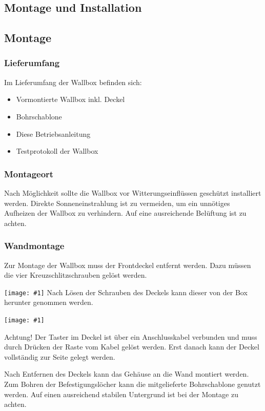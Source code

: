 \documentclass[a4paper,10pt]{article}
\newcommand{\gfx}[1]{\texttt{[image: \#1]}}
\begin{document}
\begin{multicols*}{2}
	\section{Montage und Installation}
	\subsection{Montage}
	\subsubsection{Lieferumfang}
	Im Lieferumfang der Wallbox befinden sich:
	\begin{itemize}
		\item Vormontierte Wallbox inkl. Deckel
		\item Bohrschablone
		\item Diese Betriebsanleitung
		\item Testprotokoll der Wallbox
	\end{itemize}

	\subsubsection{Montageort}
	Nach Möglichkeit sollte die Wallbox vor Witterungseinflüssen geschützt
	installiert werden. Direkte Sonneneinstrahlung ist zu vermeiden, um ein
	unnötiges Aufheizen der Wallbox zu verhindern. Auf eine ausreichende Belüftung
	ist zu achten.

	\subsubsection{Wandmontage}\label{wandmontage}
	Zur Montage der Wallbox muss der Frontdeckel entfernt werden. Dazu müssen die
	vier Kreuzschlitzschrauben gelöst werden.

	\gfx{./img/resized/warp_screw_points_ready}
	Nach Lösen der Schrauben des Deckels kann dieser von der Box herunter genommen
	werden.

	\gfx{./img/resized/warp_button_connect_arrow_ready}

	Achtung! Der Taster im Deckel ist über ein Anschlusskabel verbunden und muss
	durch Drücken der Raste vom Kabel gelöst werden. Erst
	danach kann der Deckel vollständig zur Seite gelegt werden.

	Nach Entfernen des Deckels kann das Gehäuse an die Wand montiert werden. Zum
	Bohren der Befestigungslöcher kann die mitgelieferte Bohrschablone genutzt
	werden. Auf einen ausreichend stabilen Untergrund ist bei der Montage zu
	achten.


\end{multicols*}
\end{document}
